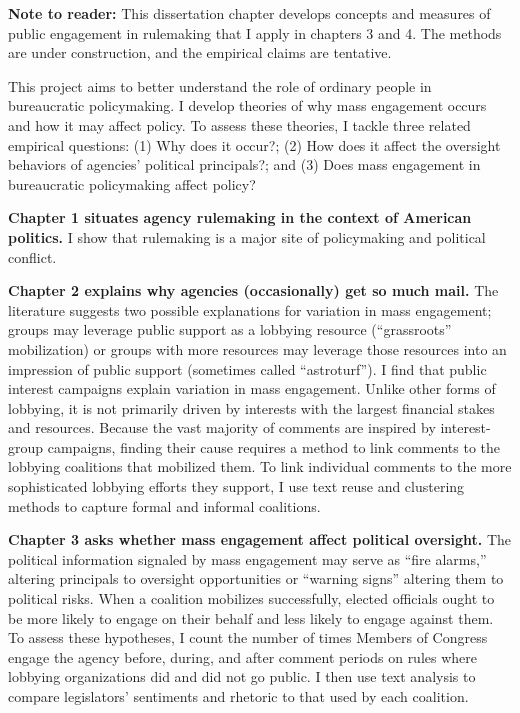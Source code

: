 \documentclass[
      12pt,
        ]{article}
\begin{document}







  \newpage

\noindent 
 
   
   
\textbf{Note to reader:} This dissertation chapter develops concepts and measures of public engagement in rulemaking that I apply in chapters 3 and 4. The methods are under construction, and the empirical claims are tentative.

This project aims to better understand the role of ordinary people in bureaucratic policymaking.
I develop theories of why mass engagement occurs and how it may affect policy. To assess these theories, I tackle three related empirical questions: (1) Why does it occur?; (2) How does it affect the oversight behaviors of agencies' political principals?; and
(3) Does mass engagement in bureaucratic policymaking affect policy?

\textbf{Chapter 1 situates agency rulemaking in the context of American politics.} I show that rulemaking is a major site of policymaking and political conflict.

\textbf{Chapter 2 explains why agencies (occasionally) get so much mail.}
The literature suggests two possible explanations for variation in mass engagement; groups may leverage public support as a lobbying resource (``grassroots'' mobilization) or groups with more resources may leverage those resources into an impression of public support (sometimes called ``astroturf'').
I find that public interest campaigns explain variation in mass engagement. Unlike other forms of lobbying, it is not primarily driven by interests with the largest financial stakes and resources.
Because the vast majority of comments are inspired by interest-group campaigns, finding their cause requires a method to link comments to the lobbying coalitions that mobilized them. To link individual comments to the more sophisticated lobbying efforts they support, I use text reuse and clustering methods to capture formal and informal coalitions.

\textbf{Chapter 3 asks whether mass engagement affect political oversight.} The political information signaled by mass engagement may serve as ``fire alarms,'' altering principals to oversight opportunities or ``warning signs'' altering them to political risks.
When a coalition mobilizes successfully,
elected officials ought to be more likely to engage on their behalf and less likely to engage against them.
To assess these hypotheses, I count the number of times Members of Congress engage the agency before, during, and after comment periods on rules where lobbying organizations did and did not go public. I then use text analysis to compare legislators' sentiments and rhetoric to that used by each coalition.
\end{document}
